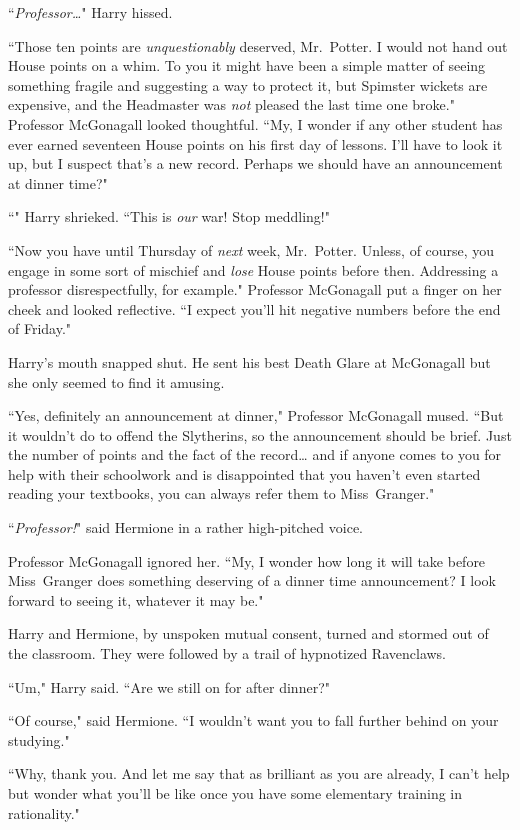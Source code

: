 ``\emph{Professor{\ldots}}" Harry hissed.

``Those ten points are \emph{unquestionably} deserved, Mr.~Potter. I would not hand out House points on a whim. To you it might have been a simple matter of seeing something fragile and suggesting a way to protect it, but Spimster wickets are expensive, and the Headmaster was \emph{not} pleased the last time one broke." Professor McGonagall looked thoughtful. ``My, I wonder if any other student has ever earned seventeen House points on his first day of lessons. I'll have to look it up, but I suspect that's a new record. Perhaps we should have an announcement at dinner time?"

``" Harry shrieked. ``This is \emph{our} war! Stop meddling!"

``Now you have until Thursday of \emph{next} week, Mr.~Potter. Unless, of course, you engage in some sort of mischief and \emph{lose} House points before then. Addressing a professor disrespectfully, for example." Professor McGonagall put a finger on her cheek and looked reflective. ``I expect you'll hit negative numbers before the end of Friday."

Harry's mouth snapped shut. He sent his best Death Glare at McGonagall but she only seemed to find it amusing.

``Yes, definitely an announcement at dinner," Professor McGonagall mused. ``But it wouldn't do to offend the Slytherins, so the announcement should be brief. Just the number of points and the fact of the record{\ldots} and if anyone comes to you for help with their schoolwork and is disappointed that you haven't even started reading your textbooks, you can always refer them to Miss~Granger."

``\emph{Professor!}" said Hermione in a rather high-pitched voice.

Professor McGonagall ignored her. ``My, I wonder how long it will take before Miss~Granger does something deserving of a dinner time announcement? I look forward to seeing it, whatever it may be."

Harry and Hermione, by unspoken mutual consent, turned and stormed out of the classroom. They were followed by a trail of hypnotized Ravenclaws.

``Um," Harry said. ``Are we still on for after dinner?"

``Of course," said Hermione. ``I wouldn't want you to fall further behind on your studying."

``Why, thank you. And let me say that as brilliant as you are already, I can't help but wonder what you'll be like once you have some elementary training in rationality."

